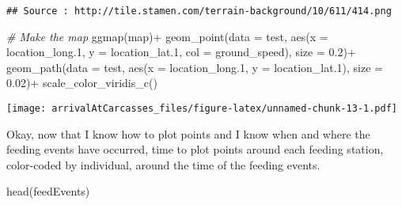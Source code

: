 \documentclass[
]{article}
\newenvironment{Shaded}{\begin{snugshade}}{\end{snugshade}}
\newcommand{\AttributeTok}[1]{\textcolor[rgb]{0.77,0.63,0.00}{#1}}
\newcommand{\CommentTok}[1]{\textcolor[rgb]{0.56,0.35,0.01}{\textit{#1}}}
\newcommand{\FloatTok}[1]{\textcolor[rgb]{0.00,0.00,0.81}{#1}}
\newcommand{\FunctionTok}[1]{\textcolor[rgb]{0.00,0.00,0.00}{#1}}
\newcommand{\NormalTok}[1]{#1}
\newcommand{\SpecialCharTok}[1]{\textcolor[rgb]{0.00,0.00,0.00}{#1}}
\begin{document}
\begin{verbatim}
## Source : http://tile.stamen.com/terrain-background/10/611/414.png
\end{verbatim}

\begin{Shaded}
\begin{Highlighting}[]
\CommentTok{\# Make the map}
\FunctionTok{ggmap}\NormalTok{(map)}\SpecialCharTok{+}
  \FunctionTok{geom\_point}\NormalTok{(}\AttributeTok{data =}\NormalTok{ test, }\FunctionTok{aes}\NormalTok{(}\AttributeTok{x =}\NormalTok{ location\_long}\FloatTok{.1}\NormalTok{, }\AttributeTok{y =}\NormalTok{ location\_lat}\FloatTok{.1}\NormalTok{, }\AttributeTok{col =}\NormalTok{ ground\_speed), }\AttributeTok{size =} \FloatTok{0.2}\NormalTok{)}\SpecialCharTok{+}
  \FunctionTok{geom\_path}\NormalTok{(}\AttributeTok{data =}\NormalTok{ test, }\FunctionTok{aes}\NormalTok{(}\AttributeTok{x =}\NormalTok{ location\_long}\FloatTok{.1}\NormalTok{, }\AttributeTok{y =}\NormalTok{ location\_lat}\FloatTok{.1}\NormalTok{), }\AttributeTok{size =} \FloatTok{0.02}\NormalTok{)}\SpecialCharTok{+}
  \FunctionTok{scale\_color\_viridis\_c}\NormalTok{()}
\end{Highlighting}
\end{Shaded}

\texttt{[image: arrivalAtCarcasses\_files/figure-latex/unnamed-chunk-13-1.pdf]}

Okay, now that I know how to plot points and I know when and where the
feeding events have occurred, time to plot points around each feeding
station, color-coded by individual, around the time of the feeding
events.

\begin{Shaded}
\begin{Highlighting}[]
\FunctionTok{head}\NormalTok{(feedEvents)}
\end{Highlighting}
\end{Shaded}
\end{document}
